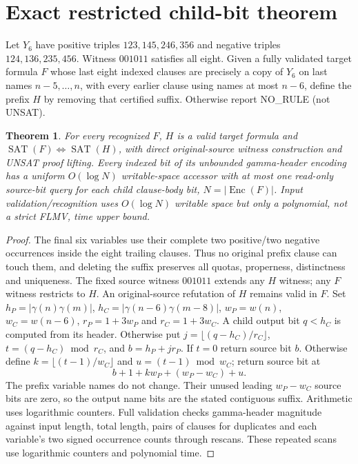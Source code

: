 \documentclass[11pt]{article}
\newtheorem{theorem}{Theorem}
\begin{document}
\section{Exact restricted child-bit theorem}
Let $Y_6$ have positive triples $123,145,246,356$ and negative triples $124,136,235,456$. Witness $001011$ satisfies all eight. Given a fully validated target formula $F$ whose last eight indexed clauses are precisely a copy of $Y_6$ on last names $n-5,\ldots,n$, with every earlier clause using names at most $n-6$, define the prefix $H$ by removing that certified suffix. Otherwise report NO\_RULE (not UNSAT).
\begin{theorem}
For every recognized $F$, $H$ is a valid target formula and $\operatorname{SAT}(F)\Leftrightarrow\operatorname{SAT}(H)$, with direct original-source witness construction and UNSAT proof lifting. Every indexed bit of its unbounded gamma-header encoding has a uniform $O(\log N)$ writable-space accessor with at most one read-only source-bit query for each child clause-body bit, $N=|\operatorname{Enc}(F)|$. Input validation/recognition uses $O(\log N)$ writable space but only a polynomial, not a strict FLMV, time upper bound.
\end{theorem}
\begin{proof}
The final six variables use their complete two positive/two negative occurrences inside the eight trailing clauses. Thus no original prefix clause can touch them, and deleting the suffix preserves all quotas, properness, distinctness and uniqueness. The fixed source witness $001011$ extends any $H$ witness; any $F$ witness restricts to $H$. An original-source refutation of $H$ remains valid in $F$.
Set $h_P=|\gamma(n)\gamma(m)|$, $h_C=|\gamma(n-6)\gamma(m-8)|$, $w_P=w(n)$, $w_C=w(n-6)$, $r_P=1+3w_P$ and $r_C=1+3w_C$. A child output bit $q<h_C$ is computed from its header. Otherwise put $j=\lfloor(q-h_C)/r_C\rfloor$, $t=(q-h_C)\bmod r_C$, and $b=h_P+jr_P$. If $t=0$ return source bit $b$. Otherwise define $k=\lfloor(t-1)/w_C\rfloor$ and $u=(t-1)\bmod w_C$; return source bit at
\[
\boxed{b+1+k w_P+(w_P-w_C)+u}.
\]
The prefix variable names do not change. Their unused leading $w_P-w_C$ source bits are zero, so the output name bits are the stated contiguous suffix. Arithmetic uses logarithmic counters. Full validation checks gamma-header magnitude against input length, total length, pairs of clauses for duplicates and each variable's two signed occurrence counts through rescans. These repeated scans use logarithmic counters and polynomial time.
\end{proof}
\end{document}
